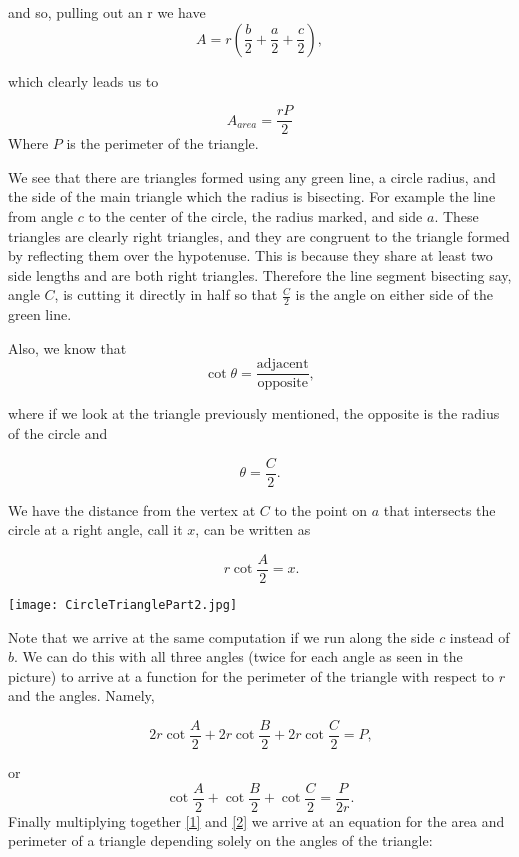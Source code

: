 \documentclass[12pt]{report}
\numberwithin{definition}{section}
\begin{document}
and so, pulling out an r we have 
\[ A = r(\frac{b}{2}+ \frac{a}{2}+ \frac{c}{2}),\]

which clearly leads us to 

\begin{equation}\label{1}
 A_{area} = \frac{rP}{2} 
\end{equation}
 Where $P$ is the perimeter of the triangle. 
 
   
 
	We see that there are triangles formed using any green line, a circle radius, and the side of the main triangle which the radius is bisecting. For example the line from angle $c$ to the center of the circle, the radius marked, and side $a$. These triangles  are clearly right triangles, and they are congruent to the triangle formed by reflecting them over the hypotenuse. This is because they share at least two side lengths and are both right triangles. Therefore the line segment bisecting say, angle $C$, is cutting it directly in half so that $\frac{C}{2}$ is the angle on either side of the green line. 

	

  

Also, we know that  \[  \cot{ \theta} = \frac{\mbox{adjacent}}{\mbox{opposite}}, \]

where if we look at the triangle previously mentioned, the opposite is the radius of the circle and 

\[\theta = \frac{C}{2}.\]

 We have the distance from the vertex at $C$ to the point on $a$ that intersects the circle at a right angle, call it $x$, can be written as 

\[\ r\cot{\frac{A}{2}} = x.\]

\texttt{[image: CircleTrianglePart2.jpg]}

Note that we arrive at the same computation if we run along the side $c$ instead of $b$. We can do this with all three angles (twice for each angle as seen in the picture) to arrive at a function for the perimeter of the triangle with respect to $r$ and the angles. Namely, 

\[\ 2r\cot{\frac{A}{2}}+ 2r\cot{\frac{B}{2}}+ 2r\cot{\frac{C}{2}} = P,\]

or 
\begin{equation}\label{2}
   \cot{\frac{A}{2}}+ \cot{\frac{B}{2}}+ \cot{\frac{C}{2}} = \frac{P}{2r}.
\end{equation}
Finally multiplying together \eqref{1} and \eqref{2} we arrive at an equation for the area and perimeter of a triangle depending solely on the angles of the triangle: 
\end{document}
